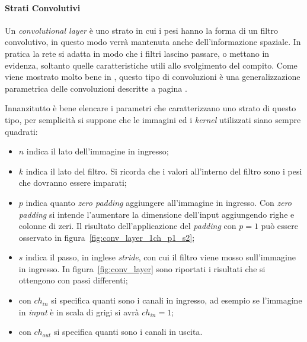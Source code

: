 \paragraph{Strati Convolutivi}
Un \textit{convolutional layer} è uno strato in cui i pesi hanno la forma di un filtro convolutivo, in questo modo verrà mantenuta anche dell'informazione spaziale.
In pratica la rete si adatta in modo che i filtri lascino passare, o mettano in evidenza, soltanto quelle caratteristiche utili allo svolgimento del compito.
Come viene mostrato molto bene in \cite{conv_arithm}, questo tipo di convoluzioni è una generalizzazione parametrica delle convoluzioni descritte a pagina \pageref{conv_para}.

Innanzitutto è bene elencare i parametri che caratterizzano uno strato di questo tipo, per semplicità si suppone che le immagini ed i \textit{kernel} utilizzati siano sempre quadrati:
\begin{itemize}
  \item $n$ indica il lato dell'immagine in ingresso;


  \item $k$ indica il lato del filtro.
    Si ricorda che i valori all'interno del filtro sono i pesi che dovranno essere imparati;

  \item $p$ indica quanto \textit{zero padding} aggiungere all'immagine in ingresso.
    Con \textit{zero padding} si intende l'aumentare la dimensione dell'input aggiungendo righe e colonne di zeri.
    Il risultato dell'applicazione del \textit{padding} con $p=1$ può essere osservato in figura~\ref{fig:conv_layer_1ch_p1_s2};

  \item $s$ indica il passo, in inglese \textit{stride}, con cui il filtro viene mosso sull'immagine in ingresso.
    In figura~\ref{fig:conv_layer} sono riportati i risultati che si ottengono con passi differenti;

  \item con $ch_{in}$ si specifica quanti sono i canali in ingresso, ad esempio se l'immagine in \textit{input} è in scala di grigi si avrà $ch_{in} = 1$;

  \item con $ch_{out}$ si specifica quanti sono i canali in uscita.

\end{itemize}
